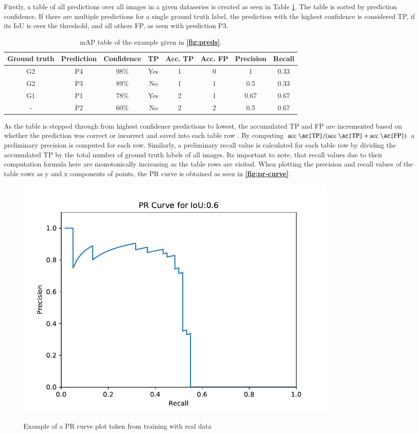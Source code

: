\documentclass[10pt]{book}
\newcommand{\figureref}[1]{\textbf{\autoref{#1}}}
\begin{document}
Firstly, a table of all predictions over all images in a given dataseries is created as seen in Table \ref{tab:mAP}. The table is sorted by prediction confidence. If there are multiple predictions for a single ground truth label, the prediction with the highest confidence is considered TP, if its \ac{IoU} is over the threshold, and all others FP, as seen with prediction P3. 

\begin{table}
  \begin{tabular}{ c c c c c c c c }
   Ground truth & Prediction & Confidence & TP & Acc. TP & Acc. FP & Precision & Recall \\ 
   \hline
   G2 & P4 & 98\% & Yes & 1 & 0 & 1 & 0.33 \\
   G2 & P3 & 89\% & No & 1 & 1 & 0.5 & 0.33 \\
   G1 & P1 & 78\% & Yes & 2 & 1 & 0.67 & 0.67 \\
   - & P2 & 60\% & No & 2 & 2 & 0.5 & 0.67 \\
   \hline
  \end{tabular}
  \caption{\label{tab:mAP}\ac{mAP} table of the example given in \figureref{fig:preds}.}
\end{table}

As the table is stepped through from highest confidence predictions to lowest, the accumulated \ac{TP} and \ac{FP} are incremented based on whether the prediction was correct or incorrect and saved into each table row \cite{padilla2020survey}. By computing $\text{acc \ac{TP}} / (\text{acc \ac{TP}} + \text{acc \ac{FP}})$ a preliminary precision is computed for each row. Similarly, a preliminary recall value is calculated for each table row by dividing the accumulated \ac{TP} by the total number of ground truth labels of all images. Its important to note, that recall values due to their computation formula here are monotonically increasing as the table rows are visited. When plotting the precision and recall values of the table rows as y and x components of points, the \ac{PR curve} is obtained as seen in \figureref{fig:pr-curve}.

\begin{figure}
  \caption{Example of a \ac{PR curve} plot taken from training with real data}
  \includegraphics[width=0.8\textwidth]{image/eval_PR_Curve_0.60}
  \label{fig:pr-curve}
\end{figure}
\end{document}
